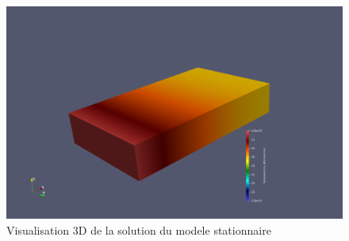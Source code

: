 \documentclass[11pt]{article} %
\begin{document}
			\begin{figure}[!htb]
				\centering
				\includegraphics[scale=0.1]{fig_7}
				\caption{Visualisation 3D de la solution du modele stationnaire}	
				\centering
				\qquad
				\qquad

\end{figure}
\end{document}
